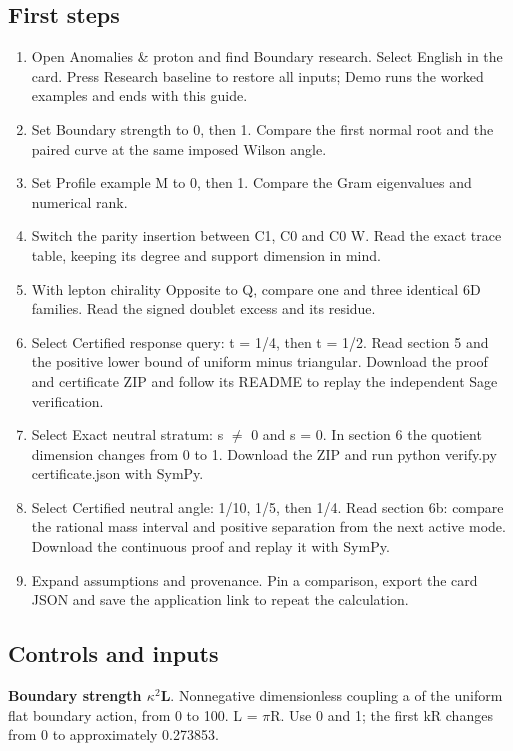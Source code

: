 \documentclass[11pt,a4paper]{article}
\begin{document}
\subsection*{First steps}
\begin{enumerate}
\item Open Anomalies \& proton and find Boundary research. Select English in the card. Press Research baseline to restore all inputs; Demo runs the worked examples and ends with this guide.
\item Set Boundary strength to 0, then 1. Compare the first normal root and the paired curve at the same imposed Wilson angle.
\item Set Profile example M to 0, then 1. Compare the Gram eigenvalues and numerical rank.
\item Switch the parity insertion between C1, C0 and C0 W. Read the exact trace table, keeping its degree and support dimension in mind.
\item With lepton chirality Opposite to Q, compare one and three identical 6D families. Read the signed doublet excess and its residue.
\item Select Certified response query: t = 1/4, then t = 1/2. Read section 5 and the positive lower bound of uniform minus triangular. Download the proof and certificate ZIP and follow its README to replay the independent Sage verification.
\item Select Exact neutral stratum: s \ensuremath{\neq} 0 and s = 0. In section 6 the quotient dimension changes from 0 to 1. Download the ZIP and run python verify.py certificate.json with SymPy.
\item Select Certified neutral angle: 1/10, 1/5, then 1/4. Read section 6b: compare the rational mass interval and positive separation from the next active mode. Download the continuous proof and replay it with SymPy.
\item Expand assumptions and provenance. Pin a comparison, export the card JSON and save the application link to repeat the calculation.
\end{enumerate}
\subsection*{Controls and inputs}
\textbf{Boundary strength \ensuremath{\kappa}\ensuremath{{}^{2}}L}. Nonnegative dimensionless coupling a of the uniform flat boundary action, from 0 to 100. L = \ensuremath{\pi}R. Use 0 and 1; the first kR changes from 0 to approximately 0.273853.
\end{document}
